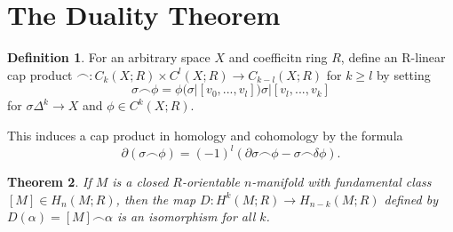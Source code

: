 \documentclass[psamsfonts]{amsart}
\newtheorem{theorem}{Theorem}[section]
\theoremstyle{definition}
\newtheorem{defn}[theorem]{Definition}
\theoremstyle{remark}
\numberwithin{equation}{section}
\begin{document}
	\section{The Duality Theorem}
		\begin{defn}
			For an arbitrary space $X$ and coefficitn ring $R$, define an
			R-linear cap product $\frown : C_k(X;R)\times C^l(X;R) \to C_{k-l}
			(X;R)$ for $k \geq l$ by setting
				\begin{equation}
					\sigma \frown \phi = \phi(\sigma | [v_0,...,v_l]) \sigma | [v_l,...,v_k]
				\end{equation}
				for $\sigma \Delta^k \to X$ and $\phi \in C^k(X;R)$.
		\end{defn}
		This induces a cap product in homology and cohomology by the formula
		\begin{equation}
			\partial (\sigma \frown \phi) = (-1)^l (\partial \sigma \frown \phi - \sigma \frown \delta \phi).
		\end{equation}
		\begin{theorem}
			If $M$ is a closed $R$-orientable $n$-manifold with fundamental class
			$[M] \in H_n(M;R)$, then the map $D: H^k(M;R) \to H_{n-k}(M;R)$ defined 
			by $D(\alpha) = [M]\frown \alpha$ is an isomorphism for all $k$.
		\end{theorem}
\end{document}
